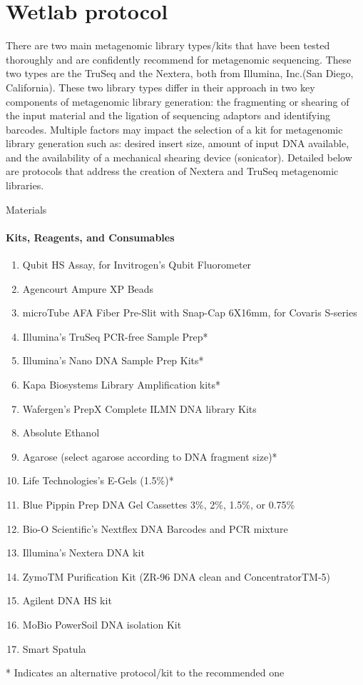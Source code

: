 \documentclass[graybox]{svmult}
\begin{document}
\section{Wetlab protocol}
There are two main metagenomic library types/kits that have been tested thoroughly and are confidently recommend for metagenomic sequencing.  These two types are the TruSeq and the Nextera, both from Illumina, Inc.(San Diego, California). These two library types differ in their approach in two key components of metagenomic library generation: the fragmenting or shearing of the input material and the ligation of sequencing adaptors and identifying barcodes. 
Multiple factors may impact the selection of a kit for metagenomic library generation such as: desired insert size, amount of input DNA available, and the availability of a mechanical shearing device (sonicator).
Detailed below are protocols that address the creation of Nextera and TruSeq metagenomic libraries. 

Materials
\paragraph{Kits, Reagents, and Consumables}
\begin{enumerate}
\item{    Qubit HS Assay, for Invitrogen’s Qubit Fluorometer}
\item{       Agencourt Ampure XP Beads}
\item{       microTube AFA Fiber Pre-Slit with Snap-Cap 6X16mm, for Covaris S-series}
\item{       Illumina’s TruSeq PCR-free Sample Prep*}
\item{       Illumina’s Nano DNA Sample Prep Kits*}
\item{       Kapa Biosystems Library Amplification kits*}
\item{       Wafergen’s PrepX Complete ILMN DNA library Kits}
\item{       Absolute Ethanol}
\item{      Agarose (select agarose according to DNA fragment size)*}
\item{      Life Technologies’s E-Gels (1.5\%)*}
\item{      Blue Pippin Prep DNA Gel Cassettes 3\%, 2\%, 1.5\%, or 0.75\%}
\item{    Bio-O Scientific’s Nextflex DNA Barcodes and PCR mixture}
\item{      Illumina’s Nextera DNA kit}
\item{      ZymoTM Purification Kit (ZR-96 DNA clean and ConcentratorTM-5)}
\item{    Agilent DNA HS kit}
\item{      MoBio PowerSoil DNA isolation Kit}
\item{      Smart Spatula}
\end{enumerate}
* Indicates an alternative protocol/kit to the recommended one
\end{document}
